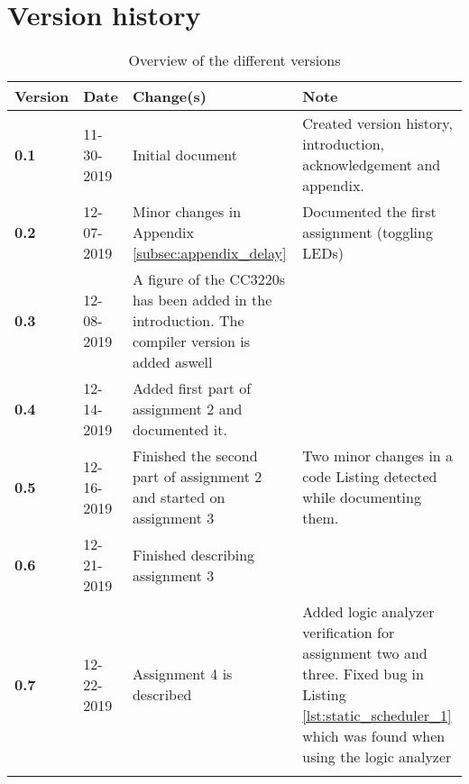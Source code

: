 \section*{Version history}


\begin{longtable}{| p{} | p{} | p{} | p{} |}

    \hline
    \textcolor{darkpink}{Version} & \textcolor{darkpink}{Date} & \textcolor{darkpink}{Change(s)} & \textcolor{darkpink}{Note} \\
     
    \hline
    \textbf{0.1} & 11-30-2019 & Initial document & Created version history, introduction, acknowledgement and appendix. \\

    \hline

    \textbf{0.2} & 12-07-2019 & Minor changes in Appendix \ref{subsec:appendix_delay} & Documented the first assignment (toggling LEDs) \\

    \hline

    \textbf{0.3} & 12-08-2019 & A figure of the CC3220s has been added in the introduction. The compiler version is added aswell & \\
    \hline

    \textbf{0.4} & 12-14-2019 & Added first part of assignment 2 and documented it. & \\

    \hline

    \textbf{0.5} & 12-16-2019 & Finished the second part of assignment 2 and started on assignment 3 & Two minor changes in a code Listing detected while documenting them. \\

    \hline

    \textbf{0.6} & 12-21-2019 & Finished describing assignment 3 &\\

    \hline

    \textbf{0.7} & 12-22-2019 & Assignment 4 is described & Added logic analyzer verification for assignment two and three. Fixed bug in Listing \ref{lst:static_scheduler_1} which was found when using the logic analyzer \\

    \hline

    \caption{Overview of the different versions}
    \label{tab:version}

\end{longtable}
